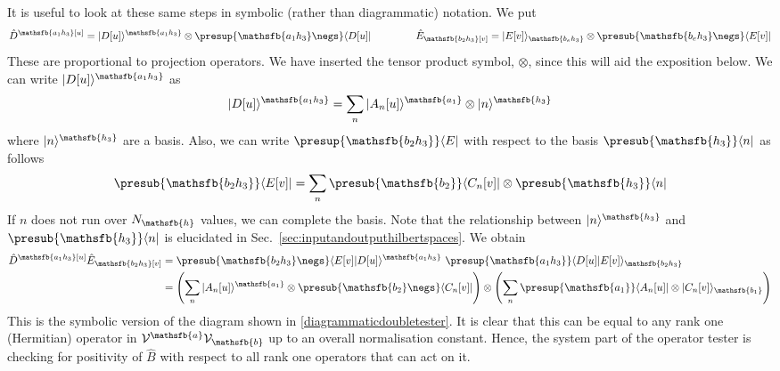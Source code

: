 \documentclass[10pt]{article}
\begin{document}
It is useful to look at these same steps in symbolic (rather than diagrammatic) notation.  We  put
\begin{equation}
\hat{D}^\mathsfb{a_1h_3}[u] = |D[u]\rangle^\mathsfb{a_1h_3}\otimes \presup{\mathsfb{a_1h_3}\negs} \langle D[u]|
~~~~~~~~~~~~~
\hat{E}_\mathsfb{b_2h_3}[v] = |E[v]\rangle_\mathsfb{b_eh_3}\otimes \presub{\mathsfb{b_eh_3} \negs} \langle E[v]|
\end{equation}
These are proportional to projection operators. We have inserted the tensor product symbol, $\otimes$, since this will aid the exposition below.   We can write $|D[u]\rangle^\mathsfb{a_1h_3}$ as
\begin{equation}
|D[u]\rangle^\mathsfb{a_1h_3} = \sum_n  |A_n[u]\rangle^\mathsfb{a_1} \otimes |n\rangle^\mathsfb{h_3}
\end{equation}
where $|n\rangle^\mathsfb{h_3}$ are a basis.  Also, we can write $\presup{\mathsfb{b_2h_3}}\langle E|$ with respect to the basis $\presub{\mathsfb{h_3}}\langle n|$ as follows
\begin{equation}
\presub{\mathsfb{b_2h_3}}\langle E[v]| = \sum_n \presub{\mathsfb{b_2}}\langle C_n[v]|\otimes \presub{\mathsfb{h_3}}\langle n|
\end{equation}
If $n$ does not run over $N_\mathsfb{h}$ values, we can complete the basis.  Note that the relationship between $|n\rangle^\mathsfb{h_3}$ and $\presub{\mathsfb{h_3}}\langle n|$ is elucidated in Sec.\ \ref{sec:inputandoutputhilbertspaces}.
We obtain
\begin{align}
\hat{D}^\mathsfb{a_1h_3}[u] \hat{E}_\mathsfb{b_2h_3}[v] &= \presub{\mathsfb{b_2h_3}\negs}\langle E[v]|D[u]\rangle^\mathsfb{a_1h_3} ~ \presup{\mathsfb{a_1h_3}}\langle D[u]|E[v]\rangle_\mathsfb{b_2h_3}  \\
&=
\left( \sum_n   |A_n[u]\rangle^\mathsfb{a_1} \otimes \presub{\mathsfb{b_2}\negs}\langle C_n[v]| \right)
\otimes
\left( \sum_n  \presup{\mathsfb{a_1}}\langle A_n[u]| \otimes |C_n[v]\rangle_\mathsfb{b_1} \right)
\label{DEexpansion}
\end{align}
This is the symbolic version of the diagram shown in \eqref{diagrammaticdoubletester}.   It is clear that this can be equal to any rank one (Hermitian) operator in $\mathcal{V}^\mathsfb{a}\mathcal{V}_\mathsfb{b}$ up to an overall normalisation constant.   Hence, the system part of the operator tester is checking for positivity of $\hat B$ with respect to all rank one operators that can act on it.
\end{document}
